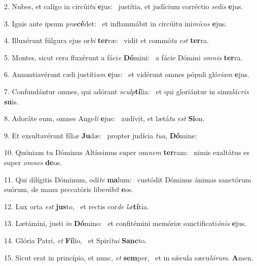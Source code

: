 2. Nubes, et calígo in circúi\textit{tu} \textbf{e}jus: \ast\  justítia, et judícium corréctio \textit{se}\textit{dis} \textbf{e}jus.\

3. Ignis ante ipsum \textit{præ}\textbf{cé}det: \ast\  et inflammábit in circúitu ini\textit{mí}\textit{cos} \textbf{e}jus.\

4. Illuxérunt fúlgura ejus or\textit{bi} \textbf{ter}ræ: \ast\  vidit et commó\textit{ta} \textit{est} \textbf{ter}ra.\

5. Montes, sicut cera fluxérunt a fáci\textit{e} \textbf{Dó}mini: \ast\  a fácie Dómini \textit{om}\textit{nis} \textbf{ter}ra.\

6. Annuntiavérunt cæli justíti\textit{am} \textbf{e}jus: \ast\  et vidérunt omnes pópuli gló\textit{ri}\textit{am} \textbf{e}jus.\

7. Confundántur omnes, qui adórant \textit{sculp}\textbf{tí}lia: \ast\  et qui gloriántur in simu\textit{lá}\textit{cris} \textbf{su}is.\

8. Adoráte eum, omnes Ange\textit{li} \textbf{e}jus: \ast\  audívit, et lætá\textit{ta} \textit{est} \textbf{Si}on.\

9. Et exsultavérunt fíli\textit{æ} \textbf{Ju}dæ: \ast\  propter judícia \textit{tu}\textit{a}, \textbf{Dó}mine:\

10. Quóniam tu Dóminus Altíssimus super om\textit{nem} \textbf{ter}ram: \ast\  nimis exaltátus es super \textit{om}\textit{nes} \textbf{de}os.\

11. Qui dilígitis Dóminum, odí\textit{te} \textbf{ma}lum: \ast\  custódit Dóminus ánimas sanctórum suórum, de manu peccatóris libe\textit{rá}\textit{bit} \textbf{e}os.\

12. Lux orta \textit{est} \textbf{jus}to, \ast\  et rectis cor\textit{de} \textit{læ}\textbf{tí}tia.\

13. Lætámini, justi \textit{in} \textbf{Dó}mino: \ast\  et confitémini memóriæ sanctificati\textit{ó}\textit{nis} \textbf{e}jus.\

14. Glória Patri, \textit{et} \textbf{Fí}lio, \ast\  et Spirí\textit{tu}\textit{i} \textbf{Sanc}to.\

15. Sicut erat in princípio, et nunc, \textit{et} \textbf{sem}per, \ast\  et in sǽcula sæcu\textit{ló}\textit{rum}. \textbf{A}men.\

